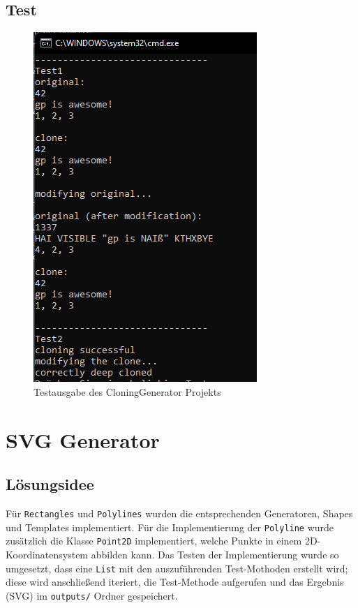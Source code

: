 \documentclass[german,notitlepage,smartquotes]{hgbreport}
\begin{document}
\subsection{Test}

\begin{figure}[h]
\centering
\includegraphics[width=.5\textwidth]{cloning_gen_test}
\caption{Testausgabe des CloningGenerator Projekts}
\label{fig:cloning_gen_test}
\end{figure}


\clearpage

\section{SVG Generator}

\subsection{Lösungsidee}

Für \texttt{Rectangles} und \texttt{Polylines} wurden die entsprechenden Generatoren, Shapes und Templates implementiert. Für die Implementierung der \texttt{Polyline} wurde zusätzlich die Klasse \texttt{Point2D} implementiert, welche Punkte in einem 2D-Koordinatensystem abbilden kann. Das Testen der Implementierung wurde so umgesetzt, dass eine \texttt{List} mit den auszuführenden Test-Mothoden erstellt wird; diese wird anschließend iteriert, die Test-Methode aufgerufen und das Ergebnis (SVG) im \texttt{outputs/} Ordner gespeichert.
\end{document}
